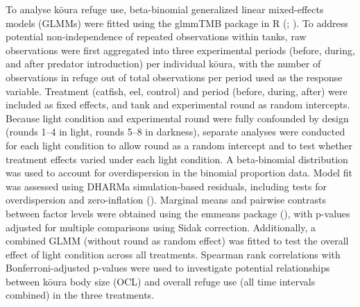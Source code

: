 \documentclass[
  letterpaper,
  DIV=11,
  numbers=noendperiod]{scrartcl}
\begin{document}
To analyse kōura refuge use, beta-binomial generalized linear
mixed-effects models (GLMMs) were fitted using the glmmTMB package in R
(;
). To address potential
non-independence of repeated observations within tanks, raw observations
were first aggregated into three experimental periods (before, during,
and after predator introduction) per individual kōura, with the number
of observations in refuge out of total observations per period used as
the response variable. Treatment (catfish, eel, control) and period
(before, during, after) were included as fixed effects, and tank and
experimental round as random intercepts. Because light condition and
experimental round were fully confounded by design (rounds 1--4 in
light, rounds 5--8 in darkness), separate analyses were conducted for
each light condition to allow round as a random intercept and to test
whether treatment effects varied under each light condition. A
beta-binomial distribution was used to account for overdispersion in the
binomial proportion data. Model fit was assessed using DHARMa
simulation-based residuals, including tests for overdispersion and
zero-inflation ().
Marginal means and pairwise contrasts between factor levels were
obtained using the emmeans package (), with p-values adjusted for multiple comparisons using Sidak
correction. Additionally, a combined GLMM (without round as random
effect) was fitted to test the overall effect of light condition across
all treatments. Spearman rank correlations with Bonferroni-adjusted
p-values were used to investigate potential relationships between kōura
body size (OCL) and overall refuge use (all time intervals combined) in
the three treatments.
\end{document}
